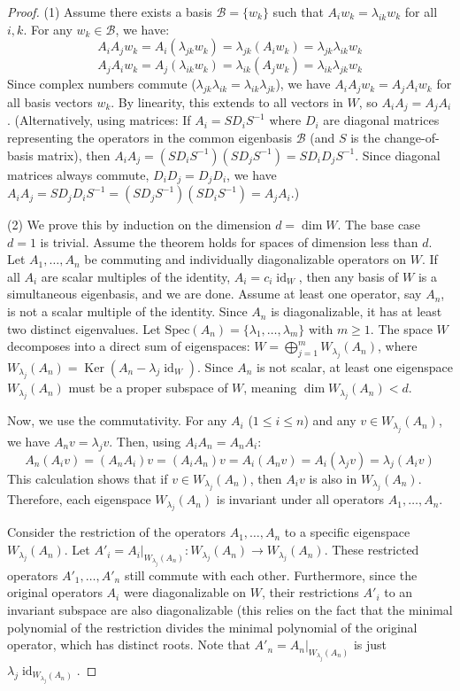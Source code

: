 \begin{proof}
(1) Assume there exists a basis $\mathcal{B}=\{w_k\}$ such that $A_i w_k = \lambda_{ik} w_k$ for all $i, k$. For any $w_k \in \mathcal{B}$, we have:
    \[ A_i A_j w_k = A_i (\lambda_{jk} w_k) = \lambda_{jk} (A_i w_k) = \lambda_{jk} \lambda_{ik} w_k \]
    \[ A_j A_i w_k = A_j (\lambda_{ik} w_k) = \lambda_{ik} (A_j w_k) = \lambda_{ik} \lambda_{jk} w_k \]
Since complex numbers commute ($\lambda_{jk} \lambda_{ik} = \lambda_{ik} \lambda_{jk}$), we have $A_i A_j w_k = A_j A_i w_k$ for all basis vectors $w_k$. By linearity, this extends to all vectors in $W$, so $A_i A_j = A_j A_i$.
(Alternatively, using matrices: If $A_i = S D_i S^{-1}$ where $D_i$ are diagonal matrices representing the operators in the common eigenbasis $\mathcal{B}$ (and $S$ is the change-of-basis matrix), then $A_i A_j = (S D_i S^{-1}) (S D_j S^{-1}) = S D_i D_j S^{-1}$. Since diagonal matrices always commute, $D_i D_j = D_j D_i$, we have $A_i A_j = S D_j D_i S^{-1} = (S D_j S^{-1}) (S D_i S^{-1}) = A_j A_i$.)

(2) We prove this by induction on the dimension $d = \dim W$. The base case $d=1$ is trivial. Assume the theorem holds for spaces of dimension less than $d$.
Let $A_1, \dots, A_n$ be commuting and individually diagonalizable operators on $W$.
If all $A_i$ are scalar multiples of the identity, $A_i = c_i \operatorname{id}_W$, then any basis of $W$ is a simultaneous eigenbasis, and we are done.
Assume at least one operator, say $A_n$, is not a scalar multiple of the identity. Since $A_n$ is diagonalizable, it has at least two distinct eigenvalues. Let $\text{Spec}(A_n) = \{\lambda_1, \dots, \lambda_m\}$ with $m \ge 1$. The space $W$ decomposes into a direct sum of eigenspaces: $W = \bigoplus_{j=1}^m W_{\lambda_j}(A_n)$, where $W_{\lambda_j}(A_n) = \operatorname{Ker}(A_n - \lambda_j \operatorname{id}_W)$. Since $A_n$ is not scalar, at least one eigenspace $W_{\lambda_j}(A_n)$ must be a proper subspace of $W$, meaning $\dim W_{\lambda_j}(A_n) < d$.

Now, we use the commutativity. For any $A_i$ ($1 \le i \le n$) and any $v \in W_{\lambda_j}(A_n)$, we have $A_n v = \lambda_j v$. Then, using $A_i A_n = A_n A_i$:
\[ A_n (A_i v) = (A_n A_i) v = (A_i A_n) v = A_i (A_n v) = A_i (\lambda_j v) = \lambda_j (A_i v) \]
This calculation shows that if $v \in W_{\lambda_j}(A_n)$, then $A_i v$ is also in $W_{\lambda_j}(A_n)$. Therefore, each eigenspace $W_{\lambda_j}(A_n)$ is invariant under all operators $A_1, \dots, A_n$.

Consider the restriction of the operators $A_1, \dots, A_n$ to a specific eigenspace $W_{\lambda_j}(A_n)$. Let $A'_i = A_i|_{W_{\lambda_j}(A_n)}: W_{\lambda_j}(A_n) \to W_{\lambda_j}(A_n)$. These restricted operators $A'_1, \dots, A'_n$ still commute with each other. Furthermore, since the original operators $A_i$ were diagonalizable on $W$, their restrictions $A'_i$ to an invariant subspace are also diagonalizable (this relies on the fact that the minimal polynomial of the restriction divides the minimal polynomial of the original operator, which has distinct roots. Note that $A'_n = A_n|_{W_{\lambda_j}(A_n)}$ is just $\lambda_j \operatorname{id}_{W_{\lambda_j}(A_n)}$.


\end{proof}
